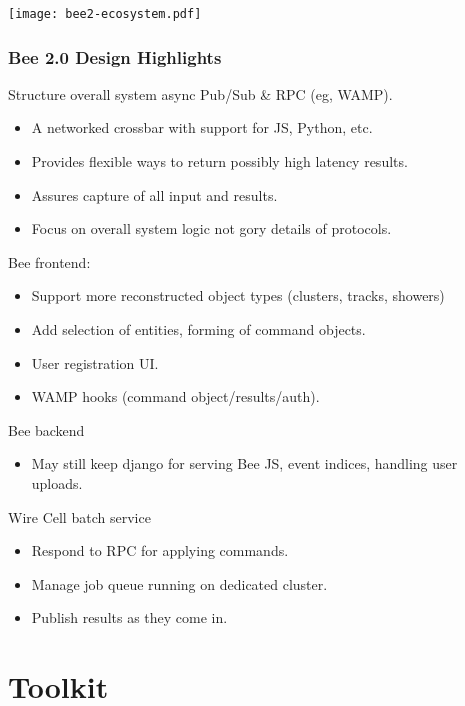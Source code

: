\documentclass[xcolor=dvipsnames]{beamer}
\begin{document}
\begin{frame}
  \texttt{[image: bee2-ecosystem.pdf]}
\end{frame}
\begin{frame}
  \frametitle{Bee 2.0 Design Highlights}

  Structure overall system async Pub/Sub \& RPC (eg,  WAMP).
  \begin{itemize}\footnotesize
  \item A networked crossbar with support for JS, Python, etc.
  \item Provides flexible ways to return possibly high latency results.
  \item Assures capture of all input and results.
  \item Focus on overall system logic not gory details of protocols.
  \end{itemize}

  Bee frontend:
  \begin{itemize}\footnotesize
  \item Support more reconstructed object types (clusters, tracks, showers)
  \item Add selection of entities, forming of command objects.
  \item User registration UI.
  \item WAMP hooks (command object/results/auth).
  \end{itemize}

  Bee backend
  \begin{itemize}\footnotesize
  \item May still keep django for serving Bee JS, event indices, handling user uploads.
  \end{itemize}

  Wire Cell batch service
  \begin{itemize}\footnotesize
  \item Respond to RPC for applying commands.
  \item Manage job queue running on dedicated cluster.
  \item Publish results as they come in.
  \end{itemize}

\end{frame}


\section{Toolkit}
\end{document}

